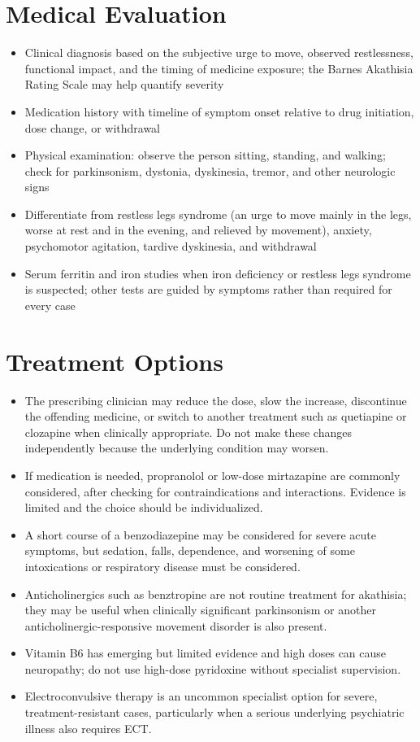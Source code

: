 \section*{Medical Evaluation}
\begin{itemize}
 \item Clinical diagnosis based on the subjective urge to move, observed restlessness, functional impact, and the timing of medicine exposure; the Barnes Akathisia Rating Scale may help quantify severity
 \item Medication history with timeline of symptom onset relative to drug initiation, dose change, or withdrawal
 \item Physical examination: observe the person sitting, standing, and walking; check for parkinsonism, dystonia, dyskinesia, tremor, and other neurologic signs
 \item Differentiate from restless legs syndrome (an urge to move mainly in the legs, worse at rest and in the evening, and relieved by movement), anxiety, psychomotor agitation, tardive dyskinesia, and withdrawal
 \item Serum ferritin and iron studies when iron deficiency or restless legs syndrome is suspected; other tests are guided by symptoms rather than required for every case
\end{itemize}

\section*{Treatment Options}
\begin{itemize}
 \item The prescribing clinician may reduce the dose, slow the increase, discontinue the offending medicine, or switch to another treatment such as quetiapine or clozapine when clinically appropriate. Do not make these changes independently because the underlying condition may worsen.
 \item If medication is needed, propranolol or low-dose mirtazapine are commonly considered, after checking for contraindications and interactions. Evidence is limited and the choice should be individualized.
 \item A short course of a benzodiazepine may be considered for severe acute symptoms, but sedation, falls, dependence, and worsening of some intoxications or respiratory disease must be considered.
 \item Anticholinergics such as benztropine are not routine treatment for akathisia; they may be useful when clinically significant parkinsonism or another anticholinergic-responsive movement disorder is also present.
 \item Vitamin B6 has emerging but limited evidence and high doses can cause neuropathy; do not use high-dose pyridoxine without specialist supervision.
 \item Electroconvulsive therapy is an uncommon specialist option for severe, treatment-resistant cases, particularly when a serious underlying psychiatric illness also requires ECT.
\end{itemize}

